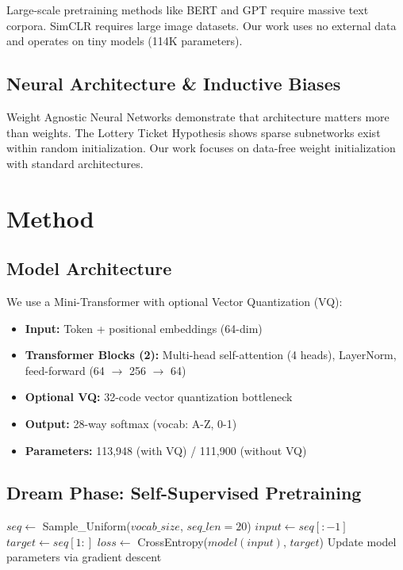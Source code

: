 \documentclass[11pt,twocolumn]{article}
\begin{document}
Large-scale pretraining methods like BERT \cite{devlin2019bert} and GPT \cite{radford2019gpt} require massive text corpora. SimCLR \cite{chen2020simclr} requires large image datasets. Our work uses no external data and operates on tiny models (114K parameters).

\subsection{Neural Architecture \& Inductive Biases}

Weight Agnostic Neural Networks \cite{gaier2019wann} demonstrate that architecture matters more than weights. The Lottery Ticket Hypothesis \cite{frankle2019lottery} shows sparse subnetworks exist within random initialization. Our work focuses on data-free weight initialization with standard architectures.

\section{Method}

\subsection{Model Architecture}

We use a Mini-Transformer with optional Vector Quantization (VQ):

\begin{itemize}
    \item \textbf{Input:} Token + positional embeddings (64-dim)
    \item \textbf{Transformer Blocks (2):} Multi-head self-attention (4 heads), LayerNorm, feed-forward (64 $\rightarrow$ 256 $\rightarrow$ 64)
    \item \textbf{Optional VQ:} 32-code vector quantization bottleneck
    \item \textbf{Output:} 28-way softmax (vocab: A-Z, 0-1)
    \item \textbf{Parameters:} 113,948 (with VQ) / 111,900 (without VQ)
\end{itemize}

\subsection{Dream Phase: Self-Supervised Pretraining}

\begin{algorithm}[h]
\caption{Dream Phase}
\begin{algorithmic}[1]
    \STATE $seq \gets$ Sample\_Uniform($vocab\_size$, $seq\_len=20$)
    \STATE $input \gets seq[:-1]$
    \STATE $target \gets seq[1:]$
    \STATE $loss \gets$ CrossEntropy($model(input)$, $target$)
    \STATE Update model parameters via gradient descent
\ENDFOR
\end{algorithmic}
\end{algorithm}
\end{document}
